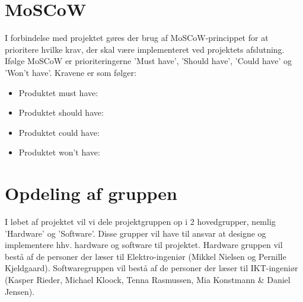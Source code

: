 \section{MoSCoW}
I forbindelse med projektet gøres der brug af MoSCoW-princippet for at prioritere hvilke krav, der skal være implementeret ved projektets afslutning. Ifølge MoSCoW er prioriteringerne 'Must have', 'Should have', 'Could have' og 'Won't have'. Kravene er som følger:
\begin{itemize}
	\item{Produktet must have:}
	\item{Produktet should have:}
	\item{Produktet could have:}
	\item{Produktet won't have:}
\end{itemize}


\section{Opdeling af gruppen}
I løbet af projektet vil vi dele projektgruppen op i 2 hovedgrupper, nemlig 'Hardware' og 'Software'. Disse grupper vil have til ansvar at designe og implementere hhv. hardware og software til projektet. Hardware gruppen vil bestå af de personer der læser til Elektro-ingeniør (Mikkel Nielsen og Pernille Kjeldgaard). Softwaregruppen vil bestå af de personer der læser til IKT-ingeniør (Kasper Rieder, Michael Kloock, Tenna Rasmussen, Mia Konstmann \& Daniel Jensen).


